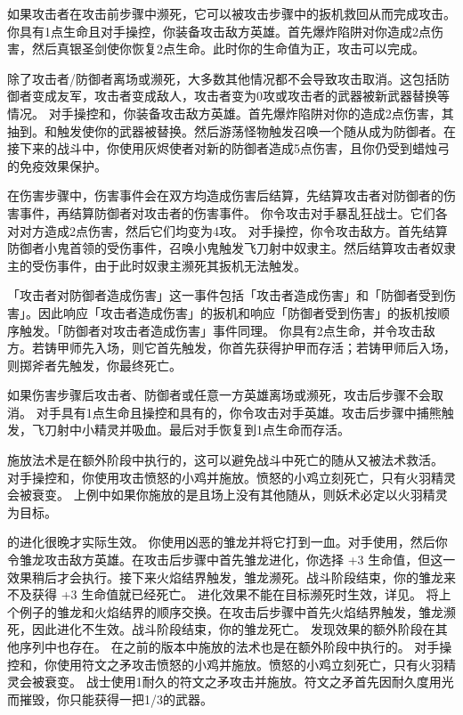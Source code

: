 如果攻击者在攻击前步骤中濒死，它可以被攻击步骤中的扳机救回从而完成攻击。
\example 你具有1点生命且对手操控，你装备攻击敌方英雄。首先爆炸陷阱对你造成2点伤害，然后真银圣剑使你恢复2点生命。此时你的生命值为正，攻击可以完成。

除了攻击者/防御者离场或濒死，大多数其他情况都不会导致攻击取消。这包括防御者变成友军，攻击者变成敌人，攻击者变为0攻或攻击者的武器被新武器替换等情况。
\example 对手操控和，你装备攻击敌方英雄。首先爆炸陷阱对你的造成2点伤害，其抽到。和触发使你的武器被替换。然后游荡怪物触发召唤一个随从成为防御者。在接下来的战斗中，你使用灰烬使者对新的防御者造成5点伤害，且你仍受到蜡烛弓的免疫效果保护。

在伤害步骤中，伤害事件会在双方均造成伤害后结算，先结算攻击者对防御者的伤害事件，再结算防御者对攻击者的伤害事件。
\example 你令攻击对手暴乱狂战士。它们各对对方造成2点伤害，然后它们均变为4攻。
\example 对手操控，你令攻击敌方。首先结算防御者小鬼首领的受伤事件，召唤小鬼触发飞刀射中奴隶主。然后结算攻击者奴隶主的受伤事件，由于此时奴隶主濒死其扳机无法触发。

\notice 「攻击者对防御者造成伤害」这一事件包括「攻击者造成伤害」和「防御者受到伤害」。因此响应「攻击者造成伤害」的扳机和响应「防御者受到伤害」的扳机按顺序触发。「防御者对攻击者造成伤害」事件同理。
\example 你具有2点生命，并令攻击敌方。若铸甲师先入场，则它首先触发，你首先获得护甲而存活；若铸甲师后入场，则掷斧者先触发，你最终死亡。

如果伤害步骤后攻击者、防御者或任意一方英雄离场或濒死，攻击后步骤不会取消。
\example 对手具有1点生命且操控和具有的，你令攻击对手英雄。攻击后步骤中捕熊触发，飞刀射中小精灵并吸血。最后对手恢复到1点生命而存活。

施放法术是在额外阶段中执行的，这可以避免战斗中死亡的随从又被法术救活。
\example 对手操控和，你使用攻击愤怒的小鸡并施放。愤怒的小鸡立刻死亡，只有火羽精灵会被衰变。
\example 上例中如果你施放的是且场上没有其他随从，则妖术必定以火羽精灵为目标。

的进化很晚才实际生效。
\example 你使用凶恶的雏龙并将它打到一血。对手使用，然后你令雏龙攻击敌方英雄。在攻击后步骤中首先雏龙进化，你选择 +3 生命值，但这一效果稍后才会执行。接下来火焰结界触发，雏龙濒死。战斗阶段结束，你的雏龙来不及获得 +3 生命值就已经死亡。
\notice 进化效果不能在目标濒死时生效，详见。
\example 将上个例子的雏龙和火焰结界的顺序交换。在攻击后步骤中首先火焰结界触发，雏龙濒死，因此进化不生效。战斗阶段结束，你的雏龙死亡。
\notice {}发现效果的额外阶段在其他序列中也存在。
\notice {}在之前的版本中施放的法术也是在额外阶段中执行的。
\example {}对手操控和，你使用符文之矛攻击愤怒的小鸡并施放。愤怒的小鸡立刻死亡，只有火羽精灵会被衰变。
\example {}战士使用1耐久的符文之矛攻击并施放。符文之矛首先因耐久度用光而摧毁，你只能获得一把1/3的武器。

